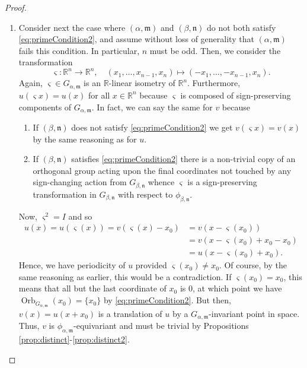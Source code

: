 \documentclass[10pt, reqno]{amsart}
\newcommand{\RR}{\mathbb{R}}
\newcommand{\m}{\mathfrak{m}}
\newcommand{\n}{\mathfrak{n}}
\numberwithin{equation}{section}
\theoremstyle{definition}
\theoremstyle{remark}
\theoremstyle{plain}
\begin{document}
\begin{proof}
\begin{enumerate}
			\item Consider next the case where $(\alpha,\m)$ and $(\beta,\n)$ do not both satisfy \eqref{eq:primeCondition2}, and assume without loss of generality that $(\alpha,\m)$ fails this condition. In particular, $n$ must be odd. Then, we consider the transformation
			\[
			\varsigma : \RR^n \to \RR^n, \quad (x_1,\dots, x_{n-1}, x_n)
			\mapsto (-x_1,\dots, -x_{n-1}, x_n).
			\]
			Again, $\varsigma \in G_{\alpha,\m}$ is an $\RR$-linear isometry of $\RR^n$. Furthermore, $u(\varsigma x) = u(x)$ for all $x \in \RR^n$ because $\varsigma$ is composed of sign-preserving components of $G_{\alpha,\m}$. In fact, we can say the same for $v$ because
			\begin{enumerate}[label=(\roman*)]
				\item If $(\beta,\n)$ does not satisfy \eqref{eq:primeCondition2} we get $v(\varsigma x) = v(x)$ by the same reasoning as for $u$.
				\item If $(\beta,\n)$ satisfies \eqref{eq:primeCondition2} there is a non-trivial copy of an orthogonal group acting upon the final coordinates not touched by any sign-changing action from $G_{\beta,\n}$ whence $\varsigma$ is a sign-preserving transformation in $G_{\beta,\n}$ with respect to $\phi_{\beta,\n}$.
			\end{enumerate}
			Now, $\varsigma^2 = I$ and so
			\begin{align*}	
				u(x) = u(\varsigma (x)) = v(\varsigma(x) - x_0) &= v(x - \varsigma(x_0))\\
				&= v(x-\varsigma(x_0) + x_0-x_0)\\
				&= u(x-\varsigma(x_0) + x_0).
			\end{align*}
			Hence, we have periodicity of $u$ provided $\varsigma(x_0) \ne x_0$. Of course, by the same reasoning as earlier, this would be a contradiction. If $\varsigma(x_0) = x_0$, this means that all but the last coordinate of $x_0$ is $0$, at which point we have $\operatorname{Orb}_{G_{\alpha,\m}}(x_0) = \{x_0\}$ by \eqref{eq:primeCondition2}. But then, $v(x) = u(x+x_0)$ is a translation of $u$ by a $G_{\alpha,\m}$-invariant point in space. Thus, $v$ is $\phi_{\alpha,\m}$-equivariant and must be trivial by Propositions \ref{prop:distinct}-\ref{prop:distinct2}. 
		\end{enumerate}
	\end{proof}
	
\end{document}

